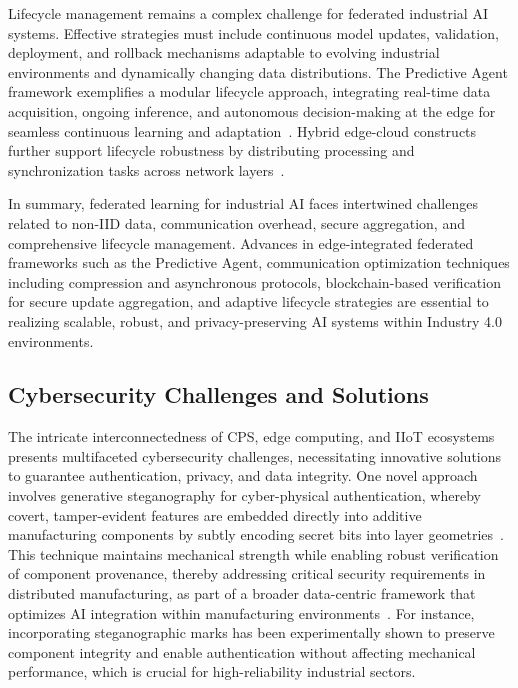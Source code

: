 \documentclass[sigconf]{acmart}
\begin{document}
Lifecycle management remains a complex challenge for federated industrial AI systems. Effective strategies must include continuous model updates, validation, deployment, and rollback mechanisms adaptable to evolving industrial environments and dynamically changing data distributions. The Predictive Agent framework exemplifies a modular lifecycle approach, integrating real-time data acquisition, ongoing inference, and autonomous decision-making at the edge for seamless continuous learning and adaptation~\cite{ref37}. Hybrid edge-cloud constructs further support lifecycle robustness by distributing processing and synchronization tasks across network layers~\cite{ref36}.

In summary, federated learning for industrial AI faces intertwined challenges related to non-IID data, communication overhead, secure aggregation, and comprehensive lifecycle management. Advances in edge-integrated federated frameworks such as the Predictive Agent, communication optimization techniques including compression and asynchronous protocols, blockchain-based verification for secure update aggregation, and adaptive lifecycle strategies are essential to realizing scalable, robust, and privacy-preserving AI systems within Industry 4.0 environments.

\subsection{Cybersecurity Challenges and Solutions}

The intricate interconnectedness of CPS, edge computing, and IIoT ecosystems presents multifaceted cybersecurity challenges, necessitating innovative solutions to guarantee authentication, privacy, and data integrity. One novel approach involves generative steganography for cyber-physical authentication, whereby covert, tamper-evident features are embedded directly into additive manufacturing components by subtly encoding secret bits into layer geometries~\cite{ref9}. This technique maintains mechanical strength while enabling robust verification of component provenance, thereby addressing critical security requirements in distributed manufacturing, as part of a broader data-centric framework that optimizes AI integration within manufacturing environments~\cite{ref13}. For instance, incorporating steganographic marks has been experimentally shown to preserve component integrity and enable authentication without affecting mechanical performance, which is crucial for high-reliability industrial sectors.
\end{document}
